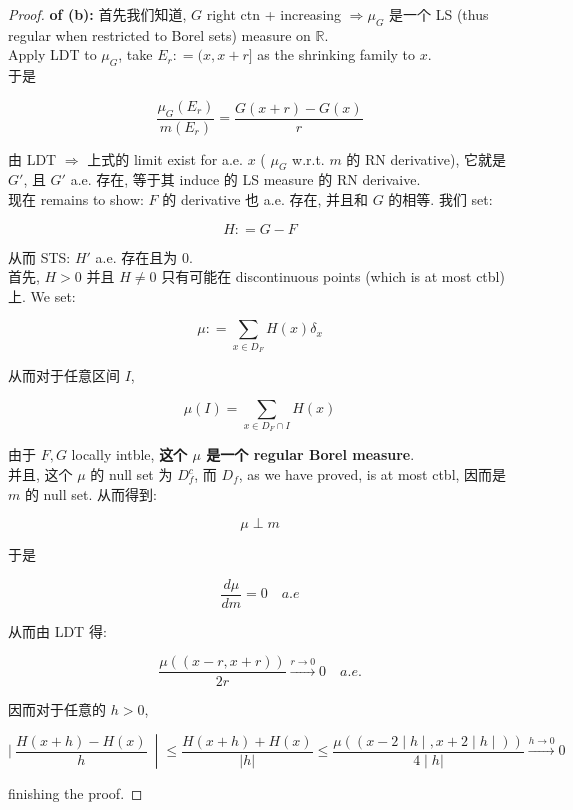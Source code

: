 \begin{proof}

\textbf{of (b):} 首先我们知道, \(G\) right ctn + increasing \(\Longrightarrow\mu_{G}\) 是一个 LS (thus regular when restricted to Borel sets) measure on \(\mathbb{R}\).\\
Apply LDT to \(\mu_{G}\), take \(E_{r}: = (x,x + r\rbrack\) as the shrinking family to \(x\).\\
于是

\[\frac{\mu_{G}(E_{r})}{m(E_{r})} = \frac{G(x + r) - G(x)}{r}\]

由 LDT \(\Longrightarrow\) 上式的 limit exist for a.e. \(x\) ( \(\mu_{G}\) w.r.t. \(m\) 的 RN derivative), 它就是 \(G'\), 且 \(G'\) a.e. 存在, 等于其 induce 的 LS measure 的 RN derivaive.\\
现在 remains to show: \(F\) 的 derivative 也 a.e. 存在, 并且和 \(G\) 的相等. 我们 set:

\[H: = G - F\]

从而 STS: \(H'\) a.e. 存在且为 \(0\).\\
首先, \(H > 0\) 并且 \(H \neq 0\) 只有可能在 discontinuous points (which is at most ctbl)上. We set:

\[\mu: = \sum\limits_{x \in D_{F}}H(x)\delta_{x}\]

从而对于任意区间 \(I\),

\[\mu(I) = \sum\limits_{x \in D_{F} \cap I}H(x)\]

由于 \(F,G\) locally intble, \textbf{这个 \(\mu\) 是一个 regular Borel measure}.\\
并且, 这个 \(\mu\) 的 null set 为 \(D_{f}^{c}\), 而 \(D_{f}\), as we have proved, is at most ctbl, 因而是 \(m\) 的 null set. 从而得到:

\[\mu \perp m\]

于是

\[\frac{d\mu}{dm} = 0\quad a.e\]

从而由 LDT 得:

\[\frac{\mu((x - r,x + r))}{2r}\overset{r\rightarrow 0}{\rightarrow}0\quad a.e.\]

因而对于任意的 \(h > 0\),

\[\left. |\ \frac{H(x + h) - H(x)}{h}\  \middle| \leq \frac{H(x + h) + H(x)}{|h|} \leq \frac{\left. \mu((x - 2 \middle| h \middle| ,x + 2 \middle| h \middle| )) \right.}{\left. 4 \middle| h| \right.}\overset{h\rightarrow 0}{\rightarrow}0 \right.\]

finishing the proof.

\end{proof}


